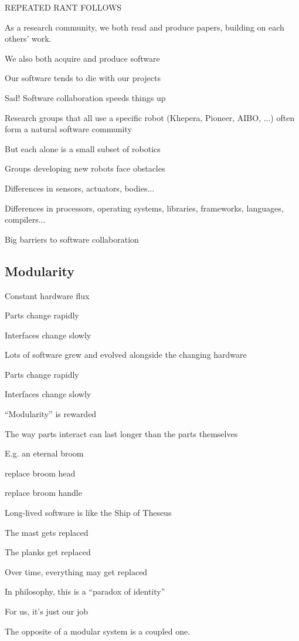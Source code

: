 REPEATED RANT FOLLOWS

As a research community, we both read and produce papers, building on
each others' work.

We also both acquire and produce software

Our software tends to die with our projects

Sad!  Software collaboration speeds things up

Research groups that all use a specific robot (Khepera, Pioneer, AIBO,
...) often form a natural software community

But each alone is a small subset of robotics

Groups developing new robots face obstacles

Differences in sensors, actuators, bodies...

Differences in processors, operating systems, libraries, frameworks,
languages, compilers...

Big barriers to software collaboration




\subsection{Modularity}

Constant hardware flux

Parts change rapidly

Interfaces change slowly

Lots of software grew and evolved alongside the changing hardware

Parts change rapidly

Interfaces change slowly

``Modularity'' is rewarded


The way parts interact can last longer than the parts themselves

E.g. an eternal broom

replace broom head

replace broom handle


Long-lived software is like the Ship of Theseus

The mast gets replaced

The planks get replaced

Over time, everything may get replaced

In philosophy, this is a ``paradox of identity''

For us, it's just our job


The opposite of a modular system is a coupled one.

